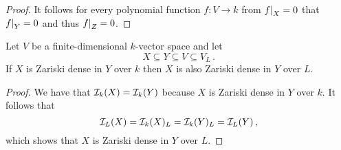 \begin{proof}
  It follows for every polynomial function $f \colon V \to k$ from $\restrict{f}{X} = 0$ that $\restrict{f}{Y} = 0$ and thus $\restrict{f}{Z} = 0$.
\end{proof}


\begin{corollary}
  \label{corollary: Zariski dense scalar extension}
  Let $V$ be a finite-dimensional $k$-vector space and let
  \[
              X
    \subseteq Y
    \subseteq V
    \subseteq V_L \,.
  \]
  If $X$ is Zariski dense in $Y$ over $k$ then $X$ is also Zariski dense in $Y$ over $L$.
\end{corollary}


\begin{proof}
  We have that $\mathcal{I}_k(X) = \mathcal{I}_k(Y)$ because $X$ is Zariski dense in $Y$ over $k$.
  It follows that
  \[
      \mathcal{I}_L(X)
    = \mathcal{I}_k(X)_L
    = \mathcal{I}_k(Y)_L
    = \mathcal{I}_L(Y) \,,
  \]
  which shows that $X$ is Zariski dense in $Y$ over $L$.
\end{proof}





